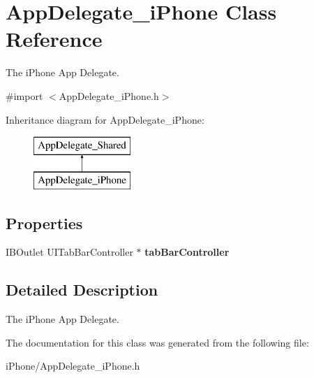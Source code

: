 \hypertarget{interface_app_delegate__i_phone}{
\section{AppDelegate\_\-iPhone Class Reference}
\label{interface_app_delegate__i_phone}
}


The iPhone App Delegate.  




{\ttfamily \#import $<$AppDelegate\_\-iPhone.h$>$}

Inheritance diagram for AppDelegate\_\-iPhone:\begin{figure}[H]
\begin{center}
\leavevmode
\includegraphics[height=2.000000cm]{interface_app_delegate__i_phone}
\end{center}
\end{figure}
\subsection*{Properties}
\begin{DoxyCompactItemize}
\item 
\hypertarget{interface_app_delegate__i_phone_a3cdc072789a263d947b7d78d70abfa25}{
IBOutlet UITabBarController $\ast$ {\bfseries tabBarController}}
\label{interface_app_delegate__i_phone_a3cdc072789a263d947b7d78d70abfa25}

\end{DoxyCompactItemize}


\subsection{Detailed Description}
The iPhone App Delegate. 

The documentation for this class was generated from the following file:\begin{DoxyCompactItemize}
\item 
iPhone/AppDelegate\_\-iPhone.h\end{DoxyCompactItemize}
